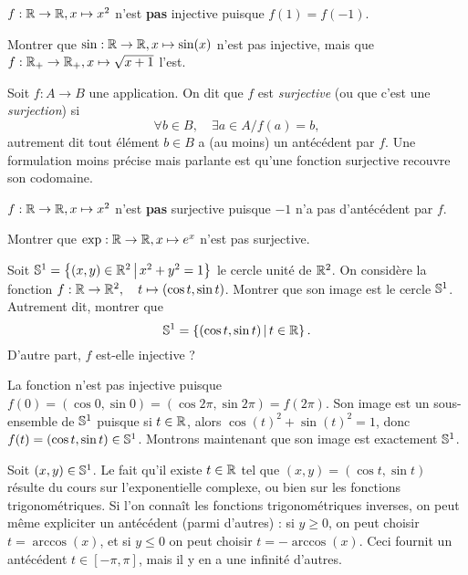 \begin{exemple}
$f : \R\to \R, x\mapsto x^2$ n'est \textbf{pas} injective puisque $f(1)=f(-1)$.
\end{exemple}


\begin{exercice}
Montrer que  $\sin : \R\to \R, x\mapsto \sin(x)$ n'est pas injective, mais que $f:\R_+\to \R_+, x\mapsto \sqrt{x+1}$ l'est.
\end{exercice}



\begin{definition}
Soit $f : A \to B$ une application. On dit que $f$ est \emph{surjective} (ou que c'est une \emph{surjection}) si
\[\forall b \in B,\quad \exists a\in A / f(a)=b,\]
autrement dit tout élément $b\in B$ a (au moins) un antécédent par $f$.
Une formulation moins précise mais parlante est  qu'une fonction surjective \og recouvre son codomaine\fg{}.
\end{definition}

\begin{exemple}
$f : \R\to \R, x\mapsto x^2$ n'est \textbf{pas} surjective puisque $-1$ n'a pas d'antécédent par $f$.
\end{exemple}

\begin{exercice}
Montrer que  $\exp: \R\to \R, x\mapsto e^x$ n'est pas surjective.
\end{exercice}


\begin{exercice}\label{exo-param-cercle}
Soit $\S^1 = \ensemble{(x,y)\in \R^2}{x^2+y^2=1}$ le cercle unité de $\R^2$. On considère la fonction $f : \R\to \R^2, \quad t\mapsto (\cos t, \sin t)$. Montrer que son image est le cercle $\S^1$. Autrement dit, montrer que
\[ \S^1=\ensemble{(\cos t, \sin t)}{t\in \R}.\]
D'autre part, $f$ est-elle injective ?
\end{exercice}
\begin{red}
La fonction n'est pas injective puisque $f(0)=(\cos 0, \sin 0) = (\cos2\pi, \sin 2\pi) = f(2\pi)$. Son image est un sous-ensemble de $\S^1$ puisque si $t\in \R$, alors $\cos(t)^2+\sin(t)^2=1$, donc $f(t)=(\cos t,\sin t) \in \S^1$. Montrons maintenant que son image est exactement $\S^1$.

Soit $(x,y)\in \S^1$. Le fait qu'il existe $t\in \R$ tel que $(x,y)=(\cos t,\sin t) $ résulte du cours sur l'exponentielle complexe, ou bien sur les fonctions trigonométriques. Si l'on connaît les fonctions trigonométriques inverses, on peut même expliciter un antécédent (parmi d'autres) : si $y\geq 0$, on peut choisir $t=\arccos(x)$, et si $y\leq 0$ on peut choisir $t=-\arccos(x)$. Ceci fournit un antécédent $t\in [-\pi,\pi]$, mais il y en a une infinité d'autres.
\end{red}


